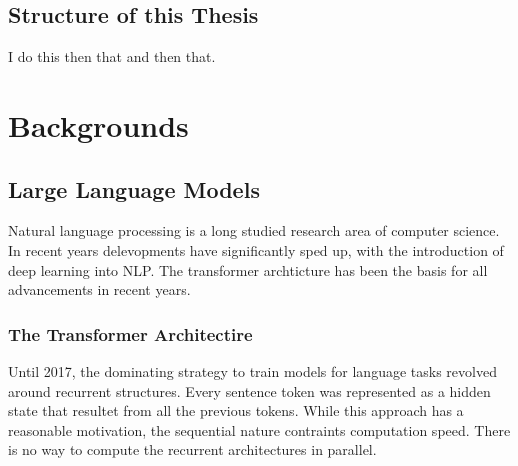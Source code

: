 \documentclass[english, version-2022-01]{uzl-thesis}
\begin{document}
\section{Structure of this Thesis}
I do this then that and then that.

\chapter{Backgrounds}






 \section{Large Language Models}

 Natural language processing is a long studied research area of computer science. In recent years delevopments have significantly sped up, with the introduction of deep learning into NLP. The transformer archticture has been the basis for all advancements in recent years.

\subsection{The Transformer Architectire}
Until 2017, the dominating strategy to train models for language tasks revolved around recurrent structures.
Every sentence token was represented as a hidden state that resultet from all the previous tokens. 
While this approach has a reasonable motivation, the sequential nature contraints computation speed.
There is no way to compute the recurrent architectures in parallel.
\end{document}
